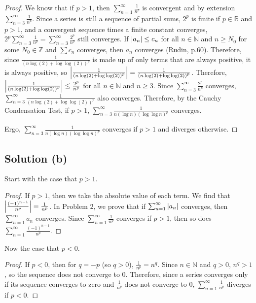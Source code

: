 \documentclass[11pt]{article}
\begin{document}
\begin{proof}
        We know that if $p > 1$, then $\sum_{n = 1}^{\infty} \frac{1}{n^p}$ is convergent and by extension $\sum_{n = 3}^{\infty} \frac{1}{n^p}$.
        Since a series is still a sequence of partial sums, $2^p$ is finite if $p \in \mathbb{R}$ and $p > 1$, and a convergent sequence times a finite constant converges, $2^p \sum_{n = 3}^{\infty} \frac{1}{n^p} = \sum_{n = 3}^{\infty} \frac{2^p}{n^p}$ still converges.
        If $\left| a_n \right| \leq c_n$ for all $n \in \mathbb{N}$ and $n \geq N_0$ for some $N_0 \in \mathbb{Z}$ and $\sum c_n$ converges, then $a_n$ converges (Rudin, p.60).
        Therefore, since $\frac{1}{\left( n\log(2) + \log \log (2) \right)^p}$ is made up of only terms that are always positive, it is always positive, so $\left| \frac{1}{\left( n\log(2) + \log \log (2) \right)^p} \right| = \frac{1}{\left( n\log(2) + \log \log (2) \right)^p}$.
        Therefore, $\left| \frac{1}{\left( n\log(2) + \log \log (2) \right)^p} \right| \leq \frac{2^p}{n^p}$ for all $n \in \mathbb{N}$ and $n \geq 3$.
        Since $\sum_{n = 3}^{\infty} \frac{2^p}{n^p}$ converges, $\sum_{n = 3}^{\infty} \frac{1}{\left( n\log(2) + \log \log (2) \right)^p}$ also converges.
        Therefore, by the Cauchy Condensation Test, if $p > 1$, $\sum_{n = 3}^{\infty} \frac{1}{n(\log n)(\log \log n)^p}$ converges.

        Ergo, $\sum_{n = 3}^{\infty} \frac{1}{n(\log n)(\log \log n)^p}$ converges if $p > 1$ and diverges otherwise.
    \end{proof}

    \subsection{Solution (b)}
        Start with the case that $p > 1$.
        \begin{proof}
            If $p > 1$, then we take the absolute value of each term.
            We find that $\left| \frac{(-1)^{n - 1}}{n^p} \right| = \frac{1}{n^p}$.
            In Problem 2, we prove that if $\sum_{n = 1}^{\infty} \left| a_n \right|$ converges, then $\sum_{n = 1}^{\infty} a_n$ converges.
            Since $\sum_{n = 1}^{\infty} \frac{1}{n^p}$ converges if $p > 1$, then so does $\sum_{n = 1}^{\infty} \frac{(-1)^{n - 1}}{n^p}$.
        \end{proof}

        Now the case that $p < 0$.
        \begin{proof}
            If $p < 0$, then for $q = -p$ (so $q > 0$), $\frac{1}{n^p} = n^q$.
            Since $n \in \mathbb{N}$ and $q > 0$, $n^q > 1$, so the sequence does not converge to $0$.
            Therefore, since a series converges only if its sequence converges to zero and $\frac{1}{n^p}$ does not converge to $0$, $\sum_{n = 1}^{\infty} \frac{1}{n^p}$ diverges if $p < 0$.
        \end{proof}
\end{document}
